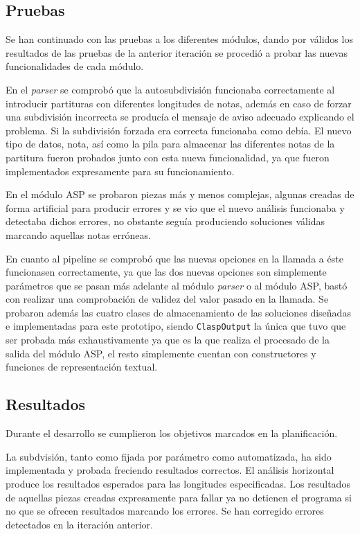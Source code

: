\subsection{Pruebas}
Se han continuado con las pruebas a los diferentes módulos, dando por válidos los resultados de las pruebas de la anterior iteración se procedió a probar las nuevas funcionalidades de cada módulo.

En el \textit{parser} se comprobó que la autosubdivisión funcionaba correctamente al introducir partituras con diferentes longitudes de notas, además en caso de forzar una subdivisión incorrecta se producía el mensaje de aviso adecuado explicando el problema. Si la subdivisión forzada era correcta funcionaba como debía. El nuevo tipo de datos, nota, así como la pila para almacenar las diferentes notas de la partitura fueron probados junto con esta nueva funcionalidad, ya que fueron implementados expresamente para su funcionamiento.

En el módulo ASP se probaron piezas más y menos complejas, algunas creadas de forma artificial para producir errores y se vio que el nuevo análisis funcionaba y detectaba dichos errores, no obstante seguía produciendo soluciones válidas marcando aquellas notas erróneas.

En cuanto al pipeline se comprobó que las nuevas opciones en la llamada a éste funcionasen correctamente, ya que las dos nuevas opciones son simplemente parámetros que se pasan más adelante al módulo \textit{parser} o al módulo ASP, bastó con realizar una comprobación de validez del valor pasado en la llamada. Se probaron además las cuatro clases de almacenamiento de las soluciones diseñadas e implementadas para este prototipo, siendo \texttt{ClaspOutput} la única que tuvo que ser probada más exhaustivamente ya que es la que realiza el procesado de la salida del módulo ASP, el resto simplemente cuentan con constructores y funciones de representación textual. 

\subsection{Resultados}
Durante el desarrollo se cumplieron los objetivos marcados en la planificación.

La subdvisión, tanto como fijada por parámetro como automatizada, ha sido implementada y probada freciendo resultados correctos. El análisis horizontal produce los resultados esperados para las longitudes especificadas. Los resultados de aquellas piezas creadas expresamente para fallar ya no detienen el programa si no que se ofrecen resultados marcando los errores. Se han corregido errores detectados en la iteración anterior.

